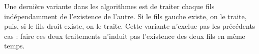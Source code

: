 \documentclass[11pt,a4paper]{article}
\begin{document}
\begin{table}[ht!]
\begin{minipage}{0.18\textwidth}
  \end{minipage}
  \hfillx
  \begin{minipage}{0.18\textwidth}


  \end{minipage}
\end{table}


\bigskip

Une dernière variante dans les algorithmes est de traiter chaque fils indépendamment de l'existence de l'autre.
Si le fils gauche existe, on le traite, puis, si le fils droit existe, on le traite.
Cette variante n'exclue pas les précédents cas : faire ces deux traitements n'induit pas l'existence des deux fils en même temps.
\end{document}
